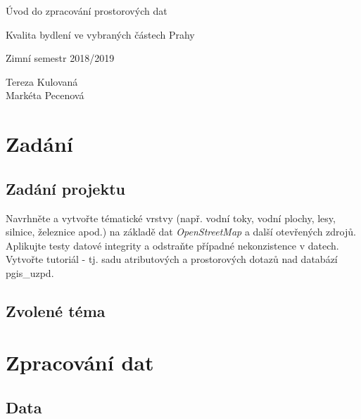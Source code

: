 \documentclass[a4paper, 12pt]{article}
\begin{document}
\begin{titlepage}
\begin{center}
\Huge
\vspace*{4.5cm}
Úvod do zpracování prostorových dat\\
\vspace{0.2cm}

\Large  
Kvalita bydlení ve vybraných částech Prahy\\
\vspace{0.2cm}

\normalsize  
Zimní semestr 2018/2019\\
\vspace{14cm}
\end{center}

\begin{flushright}
\Large
Tereza Kulovaná \\
Markéta Pecenová \\
\end{flushright}

\end{titlepage}


\pagestyle{plain}     %
\setcounter{page}{1}  %

\tableofcontents
\newpage

\section{Zadání}
\subsection{Zadání projektu}
Navrhněte a vytvořte tématické vrstvy (např. vodní toky, vodní plochy, lesy, silnice, železnice apod.) na základě dat \textit{OpenStreetMap} a další otevřených zdrojů. Aplikujte testy datové integrity a odstraňte případné nekonzistence v datech. Vytvořte tutoriál - tj. sadu atributových a prostorových dotazů nad databází pgis\_uzpd.

\subsection{Zvolené téma}


\clearpage

\section{Zpracování dat}
\subsection{Data}
\end{document}
